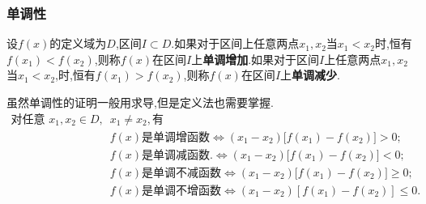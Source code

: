 \documentclass[12pt, a4paper, oneside, UTF8]{ctexbook}  %
\begin{document}
\subsubsection{单调性}
\begin{defn}{}{}
    设$f(x)$的定义域为$D$,区间$I \subset D$.如果对于区间上任意两点$x_1,x_2$当$x_1 < x_2$时,恒有$f(x_1) < f(x_2)$,则称$f(x)$在区间$I$上\textbf{单调增加}.如果对于区间$I$上任意两点$x_1,x_2$当$x_1<x_2$,时,恒有$f(x_1)>f(x_2)$,则称$f(x)$在区间$I$上\textbf{单调减少}.
\end{defn}
虽然单调性的证明一般用求导,但是定义法也需要掌握.
$$
    \begin{aligned}
        \text{对任意 }x_1,x_2\in D, & x_1\neq x_2,\text{有}                  \\
                                 & f(x)\text{是单调增函数}
        \Leftrightarrow(x_{1}-x_{2})\Big[f(x_{1})-f(x_{2})\Big]{>}0;     \\
                                 & f(x)\text{是单调减函数}.
        \Leftrightarrow(x_{1}-x_{2})\Big[f(x_{1})-f(x_{2})\Big]<0;       \\
                                 & f(x)\text{是单调不减函数}
        \Leftrightarrow(x_1-x_2){\big[}f(x_1)-f(x_2){\big]}{\geqslant}0; \\
                                 & f(x)\text{是单调不增函数}
        \Leftrightarrow(x_1-x_2){\left[f(x_1)-f(x_2)\right]}\leqslant0.
    \end{aligned}
$$
\end{document}
